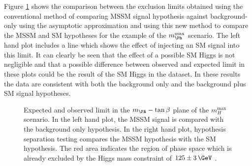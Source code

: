 Figure \ref{fig:hypotestcompare} shows the comparison between the exclusion
limits obtained using the conventional method of comparing \ac{MSSM} signal
hypothesis against background-only using the asymptotic approximation 
and using this new method to compare the
\ac{MSSM} and \ac{SM} hypotheses for the example of the $m_{\Ph}^\text{max}$
scenario. The left hand plot includes a line which shows
the effect of injecting an \ac{SM} signal into this limit. It can clearly be
seen that the effect of a possible \ac{SM} Higgs is not negligible and that a
possible difference between observed and expected limit in these plots could be 
the result of the \ac{SM} Higgs in the dataset. In these results the data are 
consistent with both the background only and the background plus \ac{SM} signal hypotheses.

\begin{figure}[tbh]
\caption[Expected and observed limit in the $m_{\PA}-\tan\beta$ plane of the
$m_H^{\text{max}}$ scenario.]{Expected and observed limit in the $m_{\PA}-\tan\beta$ plane of the
$m_H^{\text{max}}$ scenario. In the left hand plot, the \ac{MSSM} signal is
compared with the background only hypothesis. In the right hand plot, hypothesis
separation testing compares the \ac{MSSM} hypothesis with the SM
hypothesis. The red area indicates the region of phase space which is already
excluded by the Higgs mass constraint of $125\pm3\,\GeV$ \cite{HIG-13-021-twiki,HIG-13-021}.}
\label{fig:hypotestcompare}
\end{figure}


